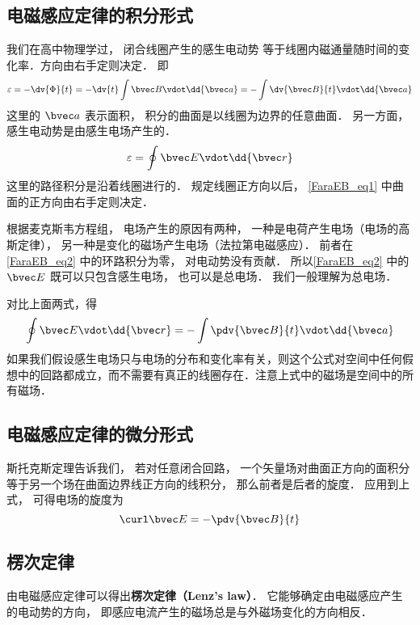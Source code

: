 
\begin{issues}
\issueAbstract
\issueTODO
\end{issues}


\subsection{电磁感应定律的积分形式}

我们在高中物理学过， 闭合线圈产生的感生电动势 %
等于线圈内磁通量随时间的变化率．方向由右手定则决定． 即
\begin{equation}\label{FaraEB_eq1}
\varepsilon  =  -\dv{\Phi}{t} =  - \dv{t} \int \bvec B \vdot \dd{\bvec a} =  - \int \dv{\bvec B}{t} \vdot \dd{\bvec a}
\end{equation} 
这里的 $\bvec a$ 表示面积， 积分的曲面是以线圈为边界的任意曲面． 另一方面，感生电动势是由感生电场产生的． 
\begin{equation}\label{FaraEB_eq2}
\varepsilon  = \oint \bvec E \vdot \dd{\bvec r}
\end{equation}
这里的路径积分是沿着线圈进行的． 规定线圈正方向以后， \autoref{FaraEB_eq1} 中曲面的正方向由右手定则决定．

根据麦克斯韦方程组， 电场产生的原因有两种， 一种是电荷产生电场（电场的高斯定律）， 另一种是变化的磁场产生电场（法拉第电磁感应）． 前者在\autoref{FaraEB_eq2} 中的环路积分为零， 对电动势没有贡献． 所以\autoref{FaraEB_eq2} 中的 $\bvec E$ 既可以只包含感生电场， 也可以是总电场． 我们一般理解为总电场．

对比上面两式，得
\begin{equation}
\oint \bvec E \vdot \dd{\bvec r}  =  - \int \pdv{\bvec B}{t} \vdot \dd{\bvec a} 
\end{equation} 
如果我们假设感生电场只与电场的分布和变化率有关，则这个公式对空间中任何假想中的回路都成立，而不需要有真正的线圈存在．注意上式中的磁场是空间中的所有磁场．

\subsection{电磁感应定律的微分形式}
斯托克斯定理告诉我们， 若对任意闭合回路， 一个矢量场对曲面正方向的面积分等于另一个场在曲面边界线正方向的线积分， 那么前者是后者的旋度．
应用到上式， 可得电场的旋度为
\begin{equation}\label{FaraEB_eq3}
\curl \bvec E =  - \pdv{\bvec B}{t}
\end{equation} 

\subsection{楞次定律}
由电磁感应定律可以得出\textbf{楞次定律（Lenz's law）}． 它能够确定由电磁感应产生的电动势的方向， 即感应电流产生的磁场总是与外磁场变化的方向相反． 
